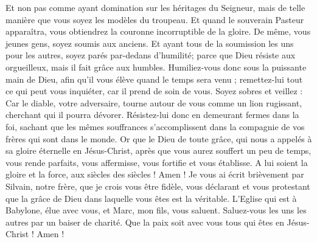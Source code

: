\begin{multicols}{2}
Et non pas comme ayant domination sur les héritages du Seigneur, mais de telle manière que vous soyez les modèles du troupeau. 
Et quand le souverain Pasteur apparaîtra, vous obtiendrez la couronne incorruptible de la gloire.
De même, vous jeunes gens, soyez soumis aux anciens. Et ayant tous de la soumission les uns pour les autres, soyez parés par-dedans d'humilité; parce que Dieu résiste aux orgueilleux, mais il fait grâce aux humbles. 
Humiliez-vous donc sous la puissante main de Dieu, afin qu'il vous élève quand le temps sera venu ;
remettez-lui tout ce qui peut vous inquiéter, car il prend de soin de vous.
Soyez sobres et veillez : Car le diable, votre adversaire, tourne autour de vous comme un lion rugissant, cherchant qui il pourra dévorer. 
Résistez-lui donc en demeurant fermes dans la foi, sachant que les mêmes souffrances s'accomplissent dans la compagnie de vos frères qui sont dans le monde. 
Or que le Dieu de toute grâce, qui nous a appelés à sa gloire éternelle en Jésus-Christ, après que vous aurez souffert un peu de temps, vous rende parfaits, vous affermisse, vous fortifie et vous établisse. 
A lui soient la gloire et la force, aux siècles des siècles ! Amen !
Je vous ai écrit brièvement par Silvain, notre frère, que je crois vous être fidèle, vous déclarant et vous protestant que la grâce de Dieu dans laquelle vous êtes est la véritable. 
L'Eglise qui est à Babylone, élue avec vous, et Marc, mon fils, vous saluent. 
Saluez-vous les uns les autres par un baiser de charité. Que la paix soit avec vous tous qui êtes en Jésus-Christ ! Amen !
\PPE{}
\end{multicols}
